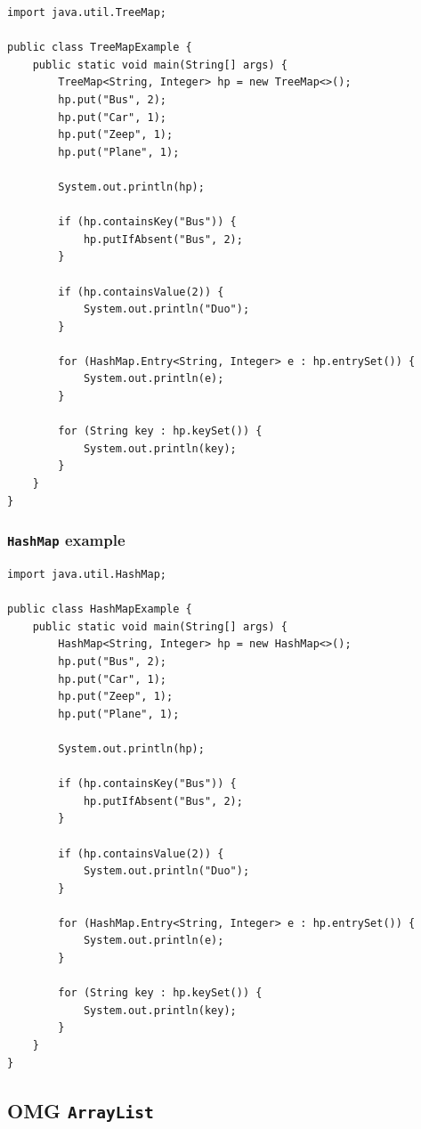\documentclass{book}
\begin{document}
\begin{verbatim}
import java.util.TreeMap;

public class TreeMapExample {
    public static void main(String[] args) {
        TreeMap<String, Integer> hp = new TreeMap<>();
        hp.put("Bus", 2);
        hp.put("Car", 1);
        hp.put("Zeep", 1);
        hp.put("Plane", 1);

        System.out.println(hp);

        if (hp.containsKey("Bus")) {
            hp.putIfAbsent("Bus", 2);
        }

        if (hp.containsValue(2)) {
            System.out.println("Duo");
        }

        for (HashMap.Entry<String, Integer> e : hp.entrySet()) {
            System.out.println(e);
        }

        for (String key : hp.keySet()) {
            System.out.println(key);
        }
    }
}
\end{verbatim}

\subsubsection{\texttt{HashMap} example}

\begin{verbatim}
import java.util.HashMap;

public class HashMapExample {
    public static void main(String[] args) {
        HashMap<String, Integer> hp = new HashMap<>();
        hp.put("Bus", 2);
        hp.put("Car", 1);
        hp.put("Zeep", 1);
        hp.put("Plane", 1);

        System.out.println(hp);

        if (hp.containsKey("Bus")) {
            hp.putIfAbsent("Bus", 2);
        }

        if (hp.containsValue(2)) {
            System.out.println("Duo");
        }

        for (HashMap.Entry<String, Integer> e : hp.entrySet()) {
            System.out.println(e);
        }

        for (String key : hp.keySet()) {
            System.out.println(key);
        }
    }
}
\end{verbatim}

\subsection{OMG \texttt{ArrayList}}
\end{document}
